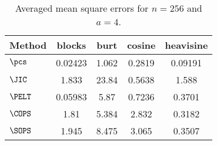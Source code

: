 \begin{table}[ht]
\centering
\begin{tabular}{lcccc}
  \hline
Method & blocks & burt & cosine & heavisine \\ 
  \hline
$\pcs$ & 0.02423 & 1.062 & 0.2819 & 0.09191 \\ 
  $\JIC$ & 1.833 & 23.84 & 0.5638 & 1.588 \\ 
  $\PELT$ & 0.05983 &  5.87 & 0.7236 & 0.3701 \\ 
  $\COPS$ &  1.81 & 5.384 & 2.832 & 0.3182 \\ 
  $\SOPS$ & 1.945 & 8.475 & 3.065 & 0.3507 \\ 
   \hline
\end{tabular}
\caption{Averaged mean square errors for $n = 256$ and $a = 4$.} 
\label{tab:aMSEn256a4}
\end{table}
